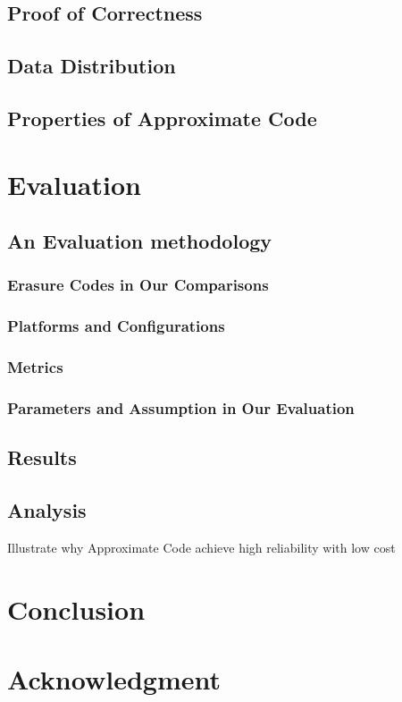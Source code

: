 \documentclass[sigconf]{acmart}
\begin{document}
\subsection{Proof of Correctness}
\subsection{Data Distribution}\label{Data Distribution}
\subsection{Properties of Approximate Code}

\section{Evaluation}\label{evaluation}
\subsection{An Evaluation methodology}
\subsubsection{Erasure Codes in Our Comparisons}
\subsubsection{Platforms and Configurations}
\subsubsection{Metrics}
\subsubsection{Parameters and Assumption in Our Evaluation}


\subsection{Results}
\subsection{Analysis}
Illustrate why Approximate Code achieve high reliability with low cost
\section{Conclusion}
\section*{Acknowledgment}
\end{document}

